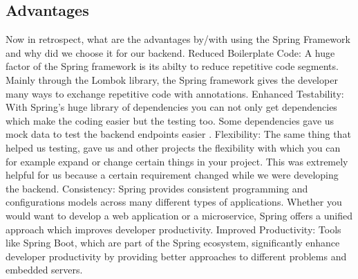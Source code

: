     \subsection{Advantages}
    Now in retrospect, what are the advantages by/with using the Spring Framework and why did we choose it for our backend.
    Reduced Boilerplate Code: A huge factor of the Spring framework is its abilty to reduce repetitive code segments. Mainly through the Lombok library, the Spring framework gives the developer many ways to exchange repetitive code with annotations.
    Enhanced Testability: With Spring's huge library of dependencies you can not only get dependencies which make the coding easier but the testing too. Some dependencies gave us mock data to test the backend endpoints easier .
    Flexibility: The same thing that helped us testing, gave us and other projects the flexibility with which you can for example expand or change certain things in your project. This was extremely helpful for us because a certain requirement changed while we were developing the backend.
    Consistency: Spring provides consistent programming and configurations models across many different types of applications. Whether you would want to develop a web application or a microservice, Spring offers a unified approach which improves developer productivity.
    Improved Productivity: Tools like Spring Boot, which are part of the Spring ecosystem, significantly enhance developer productivity by providing better approaches to different problems and embedded servers. 
    